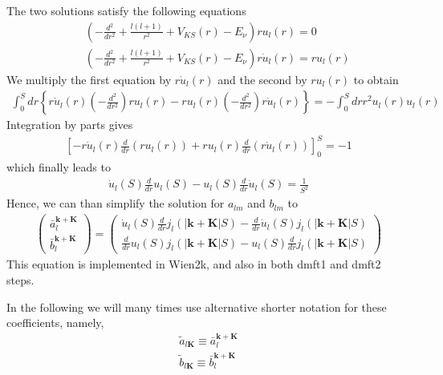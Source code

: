\documentclass[aps,prb,floatfix,epsfig,singlecolumn,showpacs,preprintnumbers]{revtex4}
\renewcommand{\vr}{{\mathbf{r}}}
\newcommand{\vk}{{\mathbf{k}}}
\newcommand{\vK}{{\mathbf{K}}}
\begin{document}
The two solutions satisfy the following equations
\begin{eqnarray}
&&\left(-\frac{d^2}{dr^2}+\frac{l(l+1)}{r^2}+V_{KS}(r)-E_\nu \right) r   u_l(r)=0
\label{Eq:S1}\\
&&\left(-\frac{d^2}{dr^2}+\frac{l(l+1)}{r^2}+V_{KS}(r)-E_\nu \right)r \dot{u}_l(r)= r u_l(r)
\label{Eq:S2}
\end{eqnarray}
We multiply the first equation by $r\dot{u}_l(r)$ and the second by $ru_l(r)$ to obtain
\begin{eqnarray}
\int_0^S dr\left\{ r\dot{u}_l(r) \left(-\frac{d^2}{dr^2}\right) r u_l(r)
-r u_l(r)
\left(-\frac{d^2}{dr^2}\right)r \dot{u}_l(r)\right\}=-\int_0^S dr r^2 u_l(r)u_l(r)
\end{eqnarray}
Integration by parts gives
\begin{eqnarray}
\left[
- r\dot{u}_l(r) \frac{d}{dr} \left(r u_l(r)\right)
+r u_l(r) \frac{d}{dr} \left(r \dot{u}_l(r)\right)\right]_0^S
=-1
\end{eqnarray}
which finally leads to
\begin{eqnarray}
\dot{u}_l(S) \frac{d}{dr} u_l(S)
-u_l(S) \frac{d}{dr} \dot{u}_l(S) =\frac{1}{S^2}
\label{Eq:tar}
\end{eqnarray}
Hence, we can than simplify the solution for $a_{lm}$ and $b_{lm}$ to 
\begin{eqnarray}
\left(
\begin{array}{c}
\bar{a}^{\vk+\vK}_{l}\\
\bar{b}^{\vk+\vK}_{l}
\end{array}
\right)=
%
\left(
\begin{array}{c}
\dot{u}_l(S)\frac{d}{dr} j_l(|\vk+\vK|S)-\frac{d}{dr} \dot{u}_l(S) j_l(|\vk+\vK|S)\\
\frac{d}{dr} u_l(S) j_l(|\vk+\vK|S)- u_l(S) \frac{d}{dr} j_l(|\vk+\vK|S)
\end{array}
\right)
\label{eq:alm}
\end{eqnarray}
This equation is implemented in Wien2k, and also in both dmft1 and
dmft2 steps.

In the following we will many times use alternative shorter notation
for these coefficients, namely,
\begin{eqnarray}
\tilde{a}_{l\vK}\equiv \bar{a}^{\vk+\vK}_l\\
\tilde{b}_{l\vK}\equiv \bar{b}^{\vk+\vK}_l
\end{eqnarray}
\end{document}
